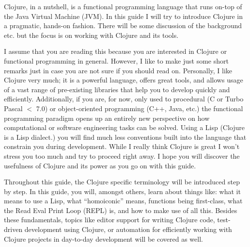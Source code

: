 Clojure, in a nutshell, is a functional programming language that runs on-top of the Java Virtual Machine (JVM).
In this guide I will try to introduce Clojure in a pragmatic, hands-on fashion.
There will be some discussion of the background etc. but the focus is on working with Clojure and its tools.

I assume that you are reading this because you are interested in Clojure or functional programming in general.
However, I like to make just some short remarks just in case you are not sure if you should read on.
Personally, I like Clojure very much;
it is a powerful language, offers great tools, and allows usage of a vast range of pre-existing libraries that help you to develop quickly and efficiently.
Additionally, if you are, for now, only used to procedural (C or Turbo Pascal $<$ 7.0) or object-oriented programming (C++, Java, etc.) the functional programming paradigm opens up an entirely new perspective on how computational or software engineering tasks can be solved.
Using a Lisp (Clojure is a Lisp dialect.) you will find much less conventions built into the language that constrain you during development.
While I really think Clojure is great I won't stress you too much and try to proceed right away.
I hope you will discover the usefulness of Clojure and its power as you go on with this guide.

Throughout this guide, the Clojure specific terminology will be introduced step by step.
In this guide, you will, amongst others, learn about things like:
what it means to use a Lisp,
what ``homoiconic'' means,
functions being first-class,
what the Read Eval Print Loop (REPL) is,
and how to make use of all this.
Besides these fundamentals, topics like
editor support for writing Clojure code,
test-driven development using Clojure,
or automation for efficiently working with Clojure projects in day-to-day development will be covered as well.

